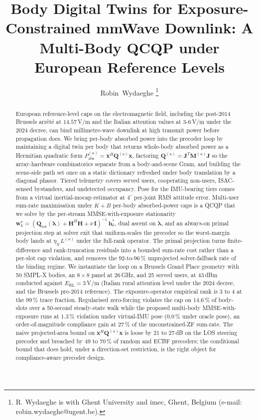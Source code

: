 \documentclass[journal,twocolumn,10pt]{IEEEtran}
\title{Body Digital Twins for Exposure-Constrained mmWave Downlink:
A Multi-Body QCQP under European Reference Levels}
\author{Robin~Wydaeghe%
  \thanks{R. Wydaeghe is with Ghent University and imec, Ghent, Belgium
  (e-mail: robin.wydaeghe@ugent.be).}}
\theoremstyle{plain}
\theoremstyle{remark}
\newcommand{\xx}{\mathbf{x}}
\newcommand{\hh}{\mathbf{h}}
\newcommand{\ww}{\mathbf{w}}
\newcommand{\Pabs}{P_{\mathrm{abs}}}
\newcommand{\Qmat}{\mathbf{Q}}
\newcommand{\Mmat}{\mathbf{M}}
\newcommand{\Jmat}{\mathbf{J}}
\begin{document}
\maketitle

\begin{abstract}
European reference-level caps on the electromagnetic field, including
the post-2014 Brussels arrêté at $14.57\,$V/m and the Italian
attention values at $3$-$6\,$V/m under the 2024 decree, can bind
millimetre-wave downlink at high transmit power before propagation
does. We bring per-body absorbed power into the precoder loop by
maintaining a digital twin per body that returns whole-body absorbed
power as a Hermitian quadratic form $\Pabs^{(u)} = \xx^H \Qmat^{(u)}
\xx$, factoring $\Qmat^{(u)} = \Jmat^T \Mmat^{(u)} \Jmat$ so the
array-hardware combinatorics separate from a body-and-scene Gram, and
building the scene-side path set once on a static dictionary
refreshed under body translation by a diagonal phasor. Tiered
telemetry covers served users, cooperating non-users, ISAC-sensed
bystanders, and undetected occupancy. Pose for the IMU-bearing tiers
comes from a virtual inertial-mocap estimator at $4^\circ$ per-joint
RMS attitude error. Multi-user sum-rate maximisation under $K + B$
per-body absorbed-power caps is a QCQP that we solve by the
per-stream MMSE-with-exposure stationarity $\ww_k^\star =
(\Qmat_{\mathrm{tot}}(\bm\lambda) + \mathbf{H}^H \mathbf{H} +
\nu\,\mathbf{I})^{-1}\,\hh_k^*$, dual ascent on $\bm\lambda$, and an
always-on primal projection step at solver exit that uniform-scales
the precoder so the worst-margin body lands at $\eta_S\,L^{(u)}$
under the full-rank operator. The primal projection turns
finite-difference and rank-truncation residuals into a bounded
sum-rate cost rather than a per-slot cap violation, and removes the
$92$-to-$96\,\%$ unprojected solver-fallback rate of the binding
regime. We instantiate the loop on a Brussels Grand Place geometry
with 50 SMPL-X bodies, an $8 \times 8$ panel at $26\,$GHz, and 25
served users, at $43\,$dBm conducted against $E_{\mathrm{RL}} =
3\,$V/m (Italian rural attention level under the 2024 decree, and
the Brussels pre-2014 reference). The exposure-operator empirical
rank is 3 to 4 at the $99\,\%$ trace fraction. Regularised
zero-forcing violates the cap on $14.6\,\%$ of body-slots over a
50-second steady-state walk while the proposed multi-body
MMSE-with-exposure runs at $1.3\,\%$ violation under virtual-IMU pose
($0.0\,\%$ under oracle pose), an order-of-magnitude compliance gain
at $27\,\%$ of the unconstrained-ZF sum-rate. The naive
projected-area bound on $\xx^H \Qmat^{(u)} \xx$ is loose by 21 to
$27\,$dB on the LOS steering precoder and breached by 49 to $70\,\%$
of random and ECBF precoders; the conditional bound that does hold,
under a direction-set restriction, is the right object for
compliance-aware precoder design.
\end{abstract}
\end{document}
